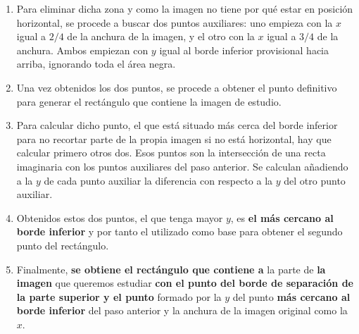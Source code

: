 \begin{enumerate}
\begin{enumerate}[label*=\arabic*.]
    \begin{enumerate}[label*=\arabic*.]
    \item Para eliminar dicha zona y como la imagen no tiene por qué
      estar en posición horizontal, se procede a buscar dos puntos
      auxiliares: uno empieza con la $x$ igual a $2/4$ de la anchura
      de la imagen, y el otro con la $x$ igual a $3/4$ de la
      anchura. Ambos empiezan con $y$ igual al borde inferior
      provisional hacia arriba, ignorando toda el área negra.
    \item Una vez obtenidos los dos puntos, se procede a obtener el
      punto definitivo para generar el rectángulo que contiene la
      imagen de estudio.
    \item Para calcular dicho punto, el que está situado más cerca del
      borde inferior para no recortar parte de la propia imagen si no
      está horizontal, hay que calcular primero otros dos. Esos puntos
      son la intersección de una recta imaginaria con los puntos
      auxiliares del paso anterior. Se calculan añadiendo a la $y$ de
      cada punto auxiliar la diferencia con respecto a la $y$ del otro
      punto auxiliar.
    \item Obtenidos estos dos puntos, el que tenga mayor $y$, es
      \textbf{el más cercano al borde inferior} y por tanto el
      utilizado como base para obtener el segundo punto del
      rectángulo.
    \item Finalmente, \textbf{se obtiene el rectángulo que contiene a}
      la parte de \textbf{la imagen} que queremos estudiar \textbf{con
        el punto del borde de separación de la parte superior y el
        punto} formado por la $y$ del punto \textbf{más cercano al
        borde inferior} del paso anterior y la anchura de la imagen
      original como la $x$.
    \end{enumerate}
  \end{enumerate}

\end{enumerate}